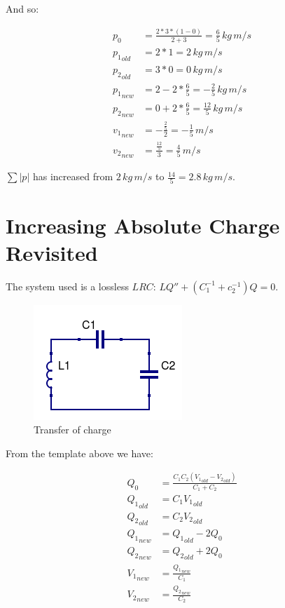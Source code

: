 \documentclass[]{elementary-physics}
\begin{document}
And so:

\begin{subequations}
\begin{align}
p_0 &= \frac{2 * 3 * (1-0)}{2 + 3} = \frac{6}{5} \, kg \, m/s \\
{p_1}_{old} &= 2 * 1 = 2 \, kg \, m/s \\
{p_2}_{old} &= 3 * 0 = 0 \, kg \, m/s \\
{p_1}_{new} &= 2 -2 * \frac{6}{5} = -\frac{2}{5} \, kg \, m/s \\
{p_2}_{new} &= 0 +2 * \frac{6}{5} = \frac{12}{5} \, kg \, m/s \\
{v_1}_{new} &= -\frac{\frac{2}{5}}{2} = -\frac{1}{5} \, m/s \\
{v_2}_{new} &= \frac{\frac{12}{5}}{3} = \frac{4}{5} \, m/s
\end{align}
\end{subequations}

$\sum |p|$ has increased from $2 \, kg \, m/s$ to $\frac{14}{5} = 2.8 \, kg \, m/s$.

\section{Increasing Absolute Charge Revisited}

The system used is a lossless $LRC$\cite{ef3ch}: $L Q'' + (C_1^{-1} + c_2^{-1}) Q = 0$.

\begin{figure}[ht] \centering
	\includegraphics[scale=.5]{LCC} \caption{Transfer of charge}
\end{figure}

From the template above we have:

\begin{subequations}
\begin{align}
Q_0 &= \frac{C_1 C_2 ({V_1}_{old}-{V_2}_{old})}{C_1 + C_2} \\
{Q_1}_{old} &= C_1 {V_1}_{old} \\
{Q_2}_{old} &= C_2 {V_2}_{old} \\
{Q_1}_{new} &= {Q_1}_{old} -2 Q_0 \\
{Q_2}_{new} &= {Q_2}_{old} +2 Q_0 \\
{V_1}_{new} &= \frac{{Q_1}_{new}}{C_1} \\
{V_2}_{new} &= \frac{{Q_2}_{new}}{C_2}
\end{align}
\end{subequations}
\end{document}
